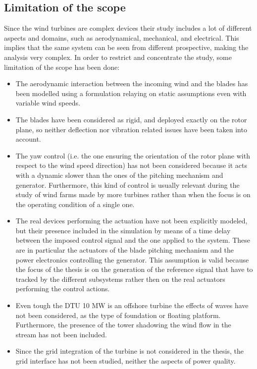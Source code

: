 \subsection{Limitation of the scope}\label{subsec:limitation_of_scope}
Since the wind turbines are complex devices their study includes a lot of different aspects and domains, such as aerodynamical, mechanical, and electrical. This implies that the same system can be seen from different prospective, making the analysis very complex. In order to restrict and concentrate the study, some limitation of the scope has been done:
\begin{itemize}
  \item The aerodynamic interaction between the incoming wind and the blades has been modelled using a formulation relaying on static assumptions even with variable wind speeds.
  \item The blades have been considered as rigid, and deployed exactly on the rotor plane, so neither deflection nor vibration related issues have been taken into account.
  \item The yaw control (i.e. the one ensuring the orientation of the rotor plane with respect to the wind speed direction) has not been considered because it acts with a dynamic slower than the ones of the pitching mechanism and generator. Furthermore, this kind of control is usually relevant during the study of wind farms made by more turbines rather than when the focus is on the operating condition of a single one. 
  \item The real devices performing the actuation have not been explicitly modeled, but their presence included in the simulation by means of a time delay between the imposed control signal and the one applied to the system. These are in particular the actuators of the blade pitching mechanism and the power electronics controlling the generator. This assumption is valid because the focus of the thesis is on the generation of the reference signal that have to tracked by the different subsystems rather then on the real actuators performing the control actions.
  \item Even tough the DTU 10 MW is an offshore turbine the effects of waves have not been considered, as the type of foundation or floating platform. Furthermore, the presence of the tower shadowing the wind flow in the stream has not been included.
  \item Since the grid integration of the turbine is not considered in the thesis, the grid interface has not been studied, neither the aspects of power quality.    
\end{itemize}